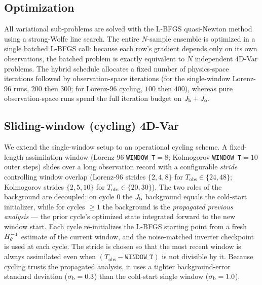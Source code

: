 \subsection{Optimization}

All variational sub-problems are solved with the L-BFGS quasi-Newton method
using a strong-Wolfe line search. The entire
$N$-sample ensemble is optimized in a single batched L-BFGS call: because each
row's gradient depends only on its own observations, the batched problem is
exactly equivalent to $N$ independent 4D-Var problems. The hybrid schedule
allocates a fixed number of physics-space iterations followed by
observation-space iterations (for the single-window Lorenz-96 runs, $200$ then
$300$; for Lorenz-96 cycling, $100$ then $400$), whereas pure observation-space
runs spend the full iteration budget on $J_{\mathrm{b}}+J_{\mathrm{o}}$.

\subsection{Sliding-window (cycling) 4D-Var}

We extend the single-window setup to an operational cycling scheme. A
fixed-length assimilation window (Lorenz-96 \texttt{WINDOW\_T}$=8$; Kolmogorov
\texttt{WINDOW\_T}$=10$ outer steps) slides over a long observation record with a
configurable \emph{stride} controlling window overlap (Lorenz-96 strides
$\{2,4,8\}$ for $T_{\text{obs}}\in\{24,48\}$; Kolmogorov strides $\{2,5,10\}$ for
$T_{\text{obs}}\in\{20,30\}$). The two roles of the background are decoupled: on
cycle $0$ the $J_{\mathrm{b}}$ background equals the cold-start initializer, while for
cycles $\ge 1$ the background is the \emph{propagated previous analysis} --- the
prior cycle's optimized state integrated forward to the new window start. Each
cycle re-initializes the L-BFGS starting point from a fresh $H^{-1}_{\theta}$ estimate of
the current window, and the noise-matched inverter checkpoint is used at each
cycle. The stride is chosen so that the most recent window is always assimilated
even when $(T_{\text{obs}}-\texttt{WINDOW\_T})$ is not divisible by it. Because
cycling trusts the propagated analysis, it uses a tighter background-error
standard deviation ($\sigma_{\mathrm{b}}=0.3$) than the cold-start single window ($\sigma_{\mathrm{b}}=1.0$).
